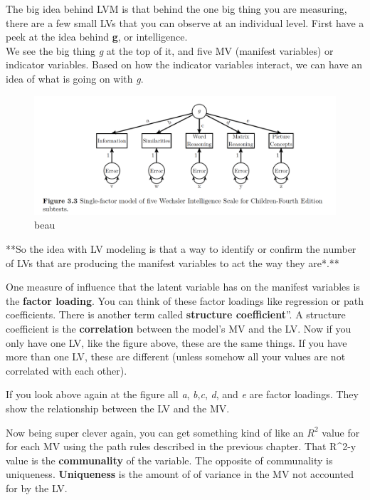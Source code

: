 \documentclass[]{book}
\theoremstyle{definition}
\theoremstyle{definition}
\theoremstyle{definition}
\theoremstyle{remark}
\begin{document}
The big idea behind LVM is that behind the one big thing you are
measuring, there are a few small LVs that you can observe at an
individual level. First have a peek at the idea behind \textbf{g}, or
intelligence.\\
We see the big thing \emph{g} at the top of it, and five MV (manifest
variables) or indicator variables. Based on how the indicator variables
interact, we can have an idea of what is going on with \emph{g}.

\begin{figure}
\centering
\includegraphics{img/beaupath9.png}
\caption{beau}
\end{figure}

**So the idea with LV modeling is that a way to identify or confirm the
number of LVs that are producing the manifest variables to act the way
they are*.**

One measure of influence that the latent variable has on the manifest
variables is the \textbf{factor loading}. You can think of these factor
loadings like regression or path coefficients. There is another term
called \textbf{structure coefficient}''. A structure coefficient is the
\textbf{correlation} between the model's MV and the LV. Now if you only
have one LV, like the figure above, these are the same things. If you
have more than one LV, these are different (unless somehow all your
values are not correlated with each other).

If you look above again at the figure all \emph{a}, \emph{b},\emph{c},
\emph{d}, and \emph{e} are factor loadings. They show the relationship
between the LV and the MV.

Now being super clever again, you can get something kind of like an
\(R^2\) value for for each MV using the path rules described in the
previous chapter. That R\^{}2-y value is the \textbf{communality} of the
variable. The opposite of communality is uniqueness. \textbf{Uniqueness}
is the amount of of variance in the MV not accounted for by the LV.
\end{document}
